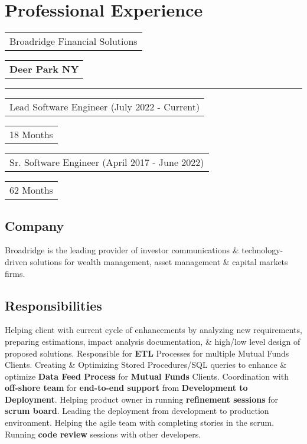 \documentclass[letterpaper,11pt]{article}
\begin{document}
\section{Professional Experience}


    \noindent
    \begin{tabular}[t]{@{}l}
    \Large{Broadridge Financial Solutions}
    \end{tabular}
    \hfill
    \begin{tabular}[t]{l@{}}
    \textbf{\color{darkgray}Deer Park NY}
    \end{tabular}
    \noindent\rule{\textwidth}{0.5pt}
    \begin{tabular}[t]{@{}l}
    Lead Software Engineer (July 2022 - Current)
    \end{tabular}
    \hfill
    \begin{tabular}[t]{l@{}}
    18 Months
    \end{tabular}
    \begin{tabular}[t]{@{}l}
    Sr. Software Engineer (April 2017 - June 2022)
    \end{tabular}
    \hfill
    \begin{tabular}[t]{l@{}}
    62 Months
    \end{tabular}

    \subsection{Company}
    Broadridge is the leading provider of investor communications \& technology-driven solutions for wealth management, asset management \& capital markets firms.

    \subsection{Responsibilities}
    Helping client with current cycle of enhancements by analyzing new requirements, preparing estimations, impact analysis documentation, \& high/low level design of proposed solutions. Responsible for \textbf{\color{darkgray}ETL} Processes for multiple Mutual Funds Clients. Creating \& Optimizing Stored Procedures/SQL queries to enhance \& optimize \textbf{\color{darkgray}Data Feed Process} for \textbf{\color{darkgray}Mutual Funds} Clients. Coordination with \textbf{\color{darkgray}off-shore team} for \textbf{\color{darkgray}end-to-end support} from \textbf{\color{darkgray}Development to Deployment}. Helping product owner in running \textbf{\color{darkgray}refinement sessions} for \textbf{\color{darkgray}scrum board}. Leading the deployment from development to production environment. Helping the agile team with completing stories in the scrum. Running \textbf{\color{darkgray}code review} sessions with other developers.
\end{document}
